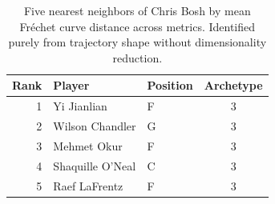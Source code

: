 \begin{table}[htbp]
  \centering\small
  \begin{tabular}{rllc}
    \toprule
    Rank & Player & Position & Archetype \\
    \midrule
    1 & Yi Jianlian & F & 3 \\
    2 & Wilson Chandler & G & 3 \\
    3 & Mehmet Okur & F & 3 \\
    4 & Shaquille O'Neal & C & 3 \\
    5 & Raef LaFrentz & F & 3 \\
    \bottomrule
  \end{tabular}
  \caption{Five nearest neighbors of Chris Bosh by mean Fr\'{e}chet curve distance across metrics. Identified purely from trajectory shape without dimensionality reduction.}
  \label{tab:Chris_Bosh_frechet_curve_neighbors}
\end{table}

